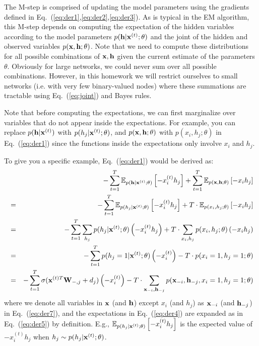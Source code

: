 \documentclass[11pt]{article}
\newcommand{\vx}{{\bf x}}
\newcommand{\vh}{{\bf h}}
\newcommand{\W}{{\bf W}}
\begin{document}
The M-step is comprised of updating the model parameters using the gradients defined in Eq.~(\ref{eq:der1},\ref{eq:der2},\ref{eq:der3}). As is typical in the EM algorithm, this M-step depends on computing the expectation of the hidden variables according to the model parameters $p(\vh|\vx^{(t)};\theta)$ and the joint of the hidden and observed variables $p(\vx,\vh;\theta)$. Note that we need to compute these distributions for all possible combinations of $\vx,\vh$ given the current estimate of the parameters $\theta$. Obviously for large networks, we could never sum over all possible combinations. However, in this homework we will restrict ourselves to small networks (i.e. with very few binary-valued nodes) where these summations are tractable using Eq.~(\ref{eq:joint}) and Bayes rules.

Note that before computing the expectations, we can first marginalize over variables that do not appear inside the expectations. For example, you can replace $p(\vh|\vx^{(t)})$ with $p(h_j|\vx^{(t)};\theta)$, and $p(\vx,\vh;\theta)$ with $p(x_i,h_j;\theta)$ in Eq.~(\ref{eq:der1}) since the functions inside the expectations only involve $x_i$ and $h_j$.

To give you a specific example, Eq.~(\ref{eq:der1}) would be derived as:
\begin{eqnarray}
\nonumber
&&-\sum_{t=1}^T \mathbb{E}_{p(\vh|\vx^{(t)};\theta)}\left[-x_i^{(t)}h_j\right]+\sum_{t=1}^T \mathbb{E}_{p(\vx,\vh;\theta)}\left[-x_ih_j\right] \\
\label{eq:der4}
&=&-\sum_{t=1}^T \mathbb{E}_{p(h_j|\vx^{(t)};\theta)}\left[-x_i^{(t)}h_j\right]+T\cdot \mathbb{E}_{p(x_i,h_j;\theta)}\left[-x_ih_j\right] \\
\label{eq:der5}
&=&-\sum_{t=1}^T \sum_{h_j}{p(h_j|\vx^{(t)};\theta)}\left(-x_i^{(t)}h_j\right)+T\cdot \sum_{x_i,h_j}{p(x_i,h_j;\theta)}\left(-x_ih_j\right) \\
\label{eq:der6}
&=&-\sum_{t=1}^T p(h_j=1|\vx^{(t)};\theta)\left(-x_i^{(t)}\right)-T \cdot p(x_i=1,h_j=1;\theta) \\
\label{eq:der7}
&=& -\sum_{t=1}^T \sigma(\vx^{(t)T}\W_{-,j} + d_j)\left(-x_i^{(t)}\right)-T \cdot\sum_{\vx_{-i},\vh_{-j}}p(\vx_{-i},\vh_{-j},x_i=1,h_j=1;\theta)
\end{eqnarray}
where we denote all variables in $\vx$ (and $\vh$) except $x_i$ (and $h_j$) as $\vx_{-i}$ (and $\vh_{-j}$) in Eq.~(\ref{eq:der7}), and the expectations in Eq.~(\ref{eq:der4}) are expanded as in Eq.~(\ref{eq:der5}) by definition. E.g., $\mathbb{E}_{p(h_j|\vx^{(t)};\theta)}\left[-x_i^{(t)}h_j\right]$ is the expected value of $-x_i^{(t)}h_j$ when $h_j \sim p(h_j|\vx^{(t)};\theta)$.
\end{document}
